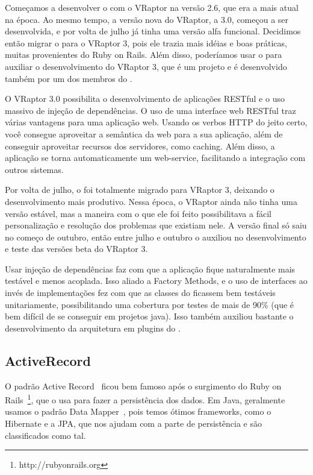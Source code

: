 Começamos a desenvolver o \calopsita com o VRaptor na versão 2.6, que era a mais atual na época. 
Ao mesmo tempo, a versão nova do VRaptor, a 3.0, começou a ser desenvolvida, e por volta de julho já tinha 
uma versão alfa funcional. Decidimos então migrar o \calopsita para o VRaptor 3, pois ele trazia mais idéias
e boas práticas, muitas provenientes do Ruby on Rails. Além disso, poderíamos usar o \calopsita para auxiliar
o desenvolvimento do VRaptor 3, que é um projeto \opensource e é desenvolvido também por um dos membros do
\calopsita.

O VRaptor 3.0 possibilita o desenvolvimento de aplicações RESTful \cite{rest} e o uso massivo de injeção de dependências\cite{di}. O uso de uma interface web RESTful traz várias vantagens para uma aplicação web. Usando os verbos HTTP do jeito certo, você consegue aproveitar a semântica da web para a sua aplicação, além de conseguir aproveitar recursos dos servidores, como caching. Além disso, a aplicação se torna automaticamente um web-service, facilitando a integração com outros sistemas.

Por volta de julho, o \calopsita foi totalmente migrado para VRaptor 3, deixando o desenvolvimento mais produtivo. Nessa época, o VRaptor ainda não tinha uma versão estável, mas a maneira com o que ele foi feito possibilitava a fácil personalização e resolução dos problemas que existiam nele. A versão final só saiu no começo de outubro, então entre julho e outubro o \calopsita auxiliou no desenvolvimento e teste das versões beta do VRaptor 3.

Usar injeção de dependências faz com que a aplicação fique naturalmente mais testável e menos acoplada. Isso aliado a Factory Methods\cite{gof}, e o uso de interfaces ao invés de implementações \cite{effective} fez com que as classes do \calopsita ficassem bem testáveis unitariamente, possibilitando uma cobertura por testes de mais de 90\% (que é bem difícil de se conseguir em projetos java). Isso também auxiliou bastante o desenvolvimento da arquitetura em plugins do \calopsita.

\subsection{ActiveRecord}

O padrão Active Record~\cite{fowler} ficou bem famoso após o surgimento do Ruby on Rails~\footnote{http://rubyonrails.org}, que o usa para fazer a persistência dos dados. Em Java, geralmente usamos o padrão Data Mapper~\cite{fowler}, pois temos ótimos frameworks, como o Hibernate e a JPA, que nos ajudam com a parte de persistência e são classificados como tal.

